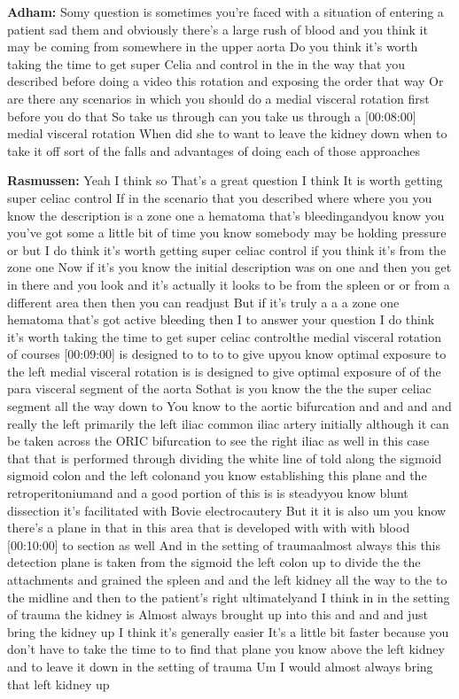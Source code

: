 \documentclass[
]{book}
\begin{document}
\textbf{Adham:} Somy question is sometimes you're faced with a situation of
entering a patient sad them and obviously there's a large rush of blood
and you think it may be coming from somewhere in the upper aorta Do you
think it's worth taking the time to get super Celia and control in the
in the way that you described before doing a video this rotation and
exposing the order that way Or are there any scenarios in which you
should do a medial visceral rotation first before you do that So take us
through can you take us through a {[}00:08:00{]} medial visceral rotation
When did she to want to leave the kidney down when to take it off sort
of the falls and advantages of doing each of those approaches

\textbf{Rasmussen:} Yeah I think so That's a great question I think It is
worth getting super celiac control If in the scenario that you described
where where you you know the description is a zone one a hematoma that's
bleedingandyou know you you've got some a little bit of time you know
somebody may be holding pressure or but I do think it's worth getting
super celiac control if you think it's from the zone one Now if it's you
know the initial description was on one and then you get in there and
you look and it's actually it looks to be from the spleen or or from a
different area then then you can readjust But if it's truly a a a zone
one hematoma that's got active bleeding then I to answer your question I
do think it's worth taking the time to get super celiac controlthe
medial visceral rotation of courses {[}00:09:00{]} is designed to to to to
give upyou know optimal exposure to the left medial visceral rotation is
is designed to give optimal exposure of of the para visceral segment of
the aorta Sothat is you know the the the super celiac segment all the
way down to You know to the aortic bifurcation and and and and really
the left primarily the left iliac common iliac artery initially although
it can be taken across the ORIC bifurcation to see the right iliac as
well in this case that that is performed through dividing the white line
of told along the sigmoid sigmoid colon and the left colonand you know
establishing this plane and the retroperitoniumand and a good portion of
this is is steadyyou know blunt dissection it's facilitated with Bovie
electrocautery But it it is also um you know there's a plane in that in
this area that is developed with with with blood {[}00:10:00{]} to section
as well And in the setting of traumaalmost always this this detection
plane is taken from the sigmoid the left colon up to divide the the
attachments and grained the spleen and and the left kidney all the way
to the to the midline and then to the patient's right ultimatelyand I
think in in the setting of trauma the kidney is Almost always brought up
into this and and and just bring the kidney up I think it's generally
easier It's a little bit faster because you don't have to take the time
to to find that plane you know above the left kidney and to leave it
down in the setting of trauma Um I would almost always bring that left
kidney up
\end{document}
